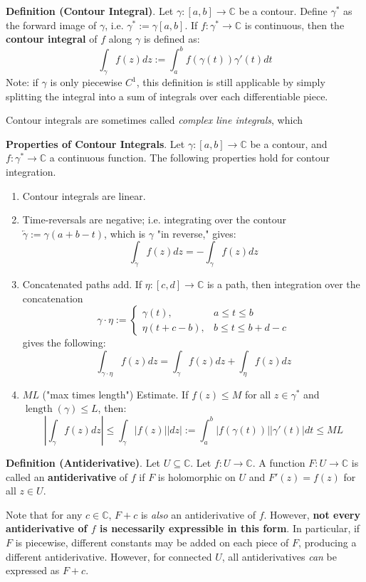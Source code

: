 \textbf{Definition (Contour Integral)}. Let $\gamma:[a,b]\to\mathbb{C}$ be a contour. Define $\gamma^*$ as the forward image of $\gamma$, i.e. $\gamma^*:=\gamma[a,b]$. If $f:\gamma^*\to\mathbb{C}$ is continuous, then the \textbf{contour integral} of $f$ along $\gamma$ is defined as: \[\int_\gamma f(z)dz := \int_a^b f(\gamma(t)) \gamma'(t)dt\] Note: if $\gamma$ is only piecewise $C^1$, this definition is still applicable by simply splitting the integral into a sum of integrals over each differentiable piece.

Contour integrals are sometimes called \textit{complex line integrals}, which \begin{shaded}
    \textbf{Properties of Contour Integrals}. Let $\gamma:[a,b]\to\mathbb{C}$ be a contour, and $f:\gamma^*\to\mathbb{C}$ a continuous function. The following properties hold for contour integration. \vspace{-1em}\begin{enumerate}
        \item[(i)] Contour integrals are linear.
        \item[(ii)] Time-reversals are negative; i.e. integrating over the contour $\overleftarrow{\gamma}:=\gamma(a+b-t)$, which is $\gamma$ "in reverse," gives: \[\int_{\overleftarrow{\gamma}} f(z)dz = -\int_\gamma f(z)dz\]
        \item[(iii)] Concatenated paths add. If $\eta:[c,d]\to\mathbb{C}$ is a path, then integration over the concatenation \[\gamma\cdot\eta:=\begin{cases}
            \gamma(t),& a\leq t\leq b\\
            \eta(t+c-b), & b\leq t\leq b+d-c
        \end{cases}\] gives the following: \[\int_{\gamma\cdot\eta} f(z)dz = \int_\gamma f(z)dz + \int_\eta f(z)dz\]
        \item[(iv)] $ML$ ("max times length") Estimate. If $f(z)\leq M$ for all $z\in\gamma^*$ and $\operatorname{length}(\gamma) \leq L$, then: \[\left|\int_\gamma f(z)dz\right| \leq \int_\gamma |f(z)||dz|:= \int_a^b |f(\gamma(t))||\gamma'(t)|dt \leq ML\]
    \end{enumerate}
\end{shaded}

\textbf{Definition (Antiderivative)}. Let $U\subseteq\mathbb{C}$. Let $f:U\to\mathbb{C}$. A function $F:U\to \mathbb{C}$ is called an \textbf{antiderivative} of $f$ if $F$ is holomorphic on $U$ and $F'(z)=f(z)$ for all $z\in U$.

Note that for any $c\in\mathbb{C}$, $F+c$ is \textit{also} an antiderivative of $f$. However, \textbf{not every antiderivative of $f$ is necessarily expressible in this form}. In particular, if $F$ is piecewise, different constants may be added on each piece of $F$, producing a different antiderivative. However, for connected $U$, all antiderivatives \textit{can} be expressed as $F+c$.


